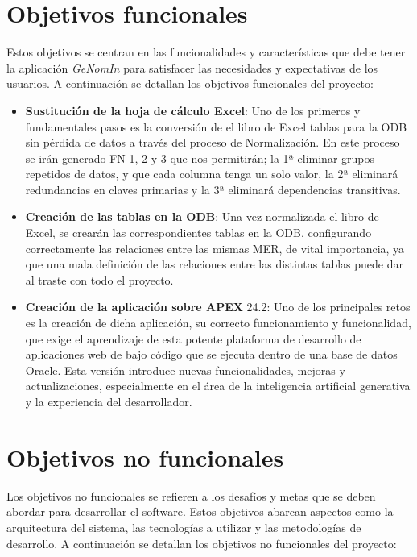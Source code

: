 
\section{Objetivos funcionales}

Estos objetivos se centran en las funcionalidades y características que debe tener la aplicación \textit{GeNomIn} para satisfacer las necesidades y expectativas de los usuarios. A continuación se detallan los objetivos funcionales del proyecto:

\begin{itemize}
	\item \textbf{Sustitución de la hoja de cálculo Excel}: Uno de los primeros y fundamentales pasos es la conversión de el libro de Excel tablas para la \acrfull{ODB} sin pérdida de datos a través del proceso de \gls{Normalización}.
	En este proceso se irán generado \acrfull{FN} 1, 2 y 3 que nos permitirán; la 1ª eliminar grupos repetidos de datos, y que cada columna tenga un solo valor, la 2ª eliminará redundancias en claves primarias y la 3ª eliminará dependencias transitivas.
	\item \textbf{Creación de las tablas en la \acrfull{ODB}}: Una vez normalizada el libro de Excel, se crearán las correspondientes tablas en la \acrshort{ODB}, configurando correctamente las relaciones entre las mismas \gls{MER}, de vital importancia, ya que una mala definición de las relaciones entre las distintas tablas puede dar al traste con todo el proyecto.
	\item \textbf{Creación de la aplicación sobre \acrfull{APEX}} 24.2: Uno de los principales retos es la creación de dicha aplicación, su correcto funcionamiento y  funcionalidad, que exige el aprendizaje de esta potente  plataforma de desarrollo de aplicaciones web de bajo código que se ejecuta dentro de una base de datos Oracle. Esta versión introduce nuevas funcionalidades, mejoras y actualizaciones, especialmente en el área de la inteligencia artificial generativa y la experiencia del desarrollador.
		
\end{itemize}

\section{Objetivos no funcionales}

Los objetivos no funcionales se refieren a los desafíos y metas que se deben abordar para desarrollar el software. Estos objetivos abarcan aspectos como la arquitectura del sistema, las tecnologías a utilizar y las metodologías de desarrollo. A continuación se detallan los objetivos no funcionales del proyecto:

